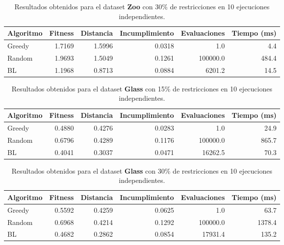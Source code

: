 \documentclass[12pt]{article}
\begin{document}
    \begin{table}[H]
        \centering
        \begin{tabular}{lrrrrr}
            \hline
            Algoritmo & Fitness & Distancia & Incumplimiento & Evaluaciones & Tiempo (ms)\\
            \hline
            Greedy & 1.7169 & 1.5996 & 0.0318 & 1.0 & 4.4 \\
            Random & 1.9693 & 1.5049 & 0.1261 & 100000.0 & 484.4 \\
            BL & 1.1968 & 0.8713 & 0.0884 & 6201.2 & 14.5 \\
            \hline
        \end{tabular}
        \caption{Resultados obtenidos para el dataset \textbf{Zoo} con 30\% de restricciones en 10 ejecuciones independientes.} %
    \end{table}

    \begin{table}[H]
        \centering
        \begin{tabular}{lrrrrr}
            \hline
            Algoritmo & Fitness & Distancia & Incumplimiento & Evaluaciones & Tiempo (ms)\\
            \hline
            Greedy & 0.4880 & 0.4276 & 0.0283 & 1.0 & 24.9 \\
            Random & 0.6796 & 0.4289 & 0.1176 & 100000.0 & 865.7 \\
            BL & 0.4041 & 0.3037 & 0.0471 & 16262.5 & 70.3 \\
            \hline
        \end{tabular}
        \caption{Resultados obtenidos para el dataset \textbf{Glass} con 15\% de restricciones en 10 ejecuciones independientes.} %
    \end{table}

    \begin{table}[H]
        \centering
        \begin{tabular}{lrrrrr}
            \hline
            Algoritmo & Fitness & Distancia & Incumplimiento & Evaluaciones & Tiempo (ms)\\
            \hline
            Greedy & 0.5592 & 0.4259 & 0.0625 & 1.0 & 63.7 \\
            Random & 0.6968 & 0.4214 & 0.1292 & 100000.0 & 1378.4 \\
            BL & 0.4682 & 0.2862 & 0.0854 & 17931.4 & 135.2 \\
            \hline
        \end{tabular}
        \caption{Resultados obtenidos para el dataset \textbf{Glass} con 30\% de restricciones en 10 ejecuciones independientes.} %
    \end{table}
\end{document}

